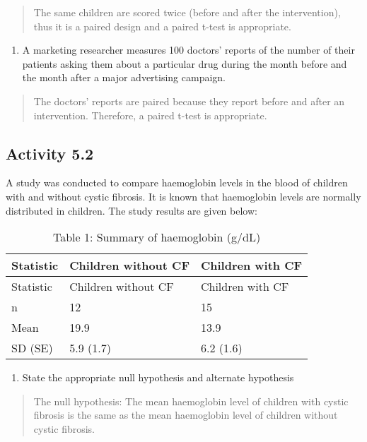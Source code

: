 \documentclass[
]{memoir}
\providecommand{\tightlist}{%
  \setlength{\itemsep}{0pt}\setlength{\parskip}{0pt}}
\begin{document}
\begin{quote}
The same children are scored twice (before and after the intervention), thus it is a paired design and a paired t-test is appropriate.
\end{quote}

\begin{enumerate}
\def\labelenumi{\alph{enumi})}
\setcounter{enumi}{3}
\tightlist
\item
  A marketing researcher measures 100 doctors' reports of the number of their patients asking them about a particular drug during the month before and the month after a major advertising campaign.
\end{enumerate}

\begin{quote}
The doctors' reports are paired because they report before and after an intervention. Therefore, a paired t-test is appropriate.
\end{quote}

\hypertarget{activity-5.2}{%
\subsection*{Activity 5.2}\label{activity-5.2}}

A study was conducted to compare haemoglobin levels in the blood of children with and without cystic fibrosis. It is known that haemoglobin levels are normally distributed in children. The study results are given below:

\begin{longtable}[]{@{}lll@{}}
\caption{Table 1: Summary of haemoglobin (g/dL)}\tabularnewline
\toprule
Statistic & Children without CF & Children with CF \\
\midrule
\endfirsthead
\toprule
Statistic & Children without CF & Children with CF \\
\midrule
\endhead
n & 12 & 15 \\
Mean & 19.9 & 13.9 \\
SD (SE) & 5.9 (1.7) & 6.2 (1.6) \\
\bottomrule
\end{longtable}

\begin{enumerate}
\def\labelenumi{\alph{enumi})}
\tightlist
\item
  State the appropriate null hypothesis and alternate hypothesis
\end{enumerate}

\begin{quote}
The null hypothesis: The mean haemoglobin level of children with cystic fibrosis is the same as the mean haemoglobin level of children without cystic fibrosis.
\end{quote}
\end{document}
